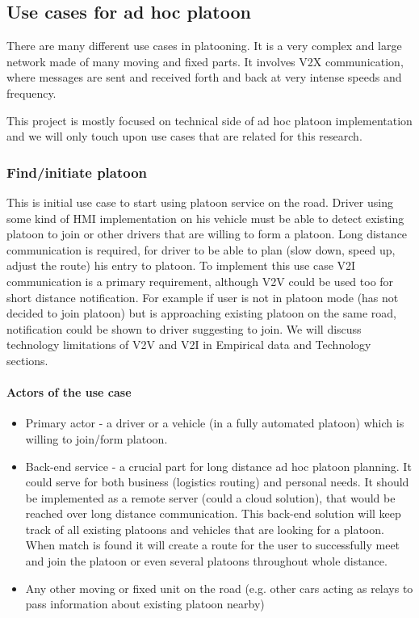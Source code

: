\subsection{Use cases for ad hoc platoon}
% 
There are many different use cases in platooning. It is a very complex and large network made of many moving and fixed parts. It involves V2X communication, where messages are sent and received forth and back at very intense speeds and frequency.\par
%  
This project is mostly focused on technical side of ad hoc platoon implementation and we will only touch upon use cases that are related for this research.
% 
\subsubsection{Find/initiate platoon}
% 
This is initial use case to start using platoon service on the road. Driver using some kind of HMI implementation on his vehicle must be able to detect existing platoon to join or other drivers that are willing to form a platoon. Long distance communication is required, for driver to be able to plan (slow down, speed up, adjust the route) his entry to platoon. To implement this use case V2I communication is a primary requirement, although V2V could be used too for short distance notification. For example if user is not in platoon mode (has not decided to join platoon) but is approaching existing platoon on the same road, notification could be shown to driver suggesting to join. We will discuss technology limitations of V2V and V2I in Empirical data and Technology sections.
% 
\paragraph{Actors of the use case}
\begin{itemize}[noitemsep]
    \item Primary actor - a driver or a vehicle (in a fully automated platoon) which is willing to join/form platoon.
    \item Back-end service - a crucial part for long distance ad hoc platoon planning. It could serve for both business (logistics routing) and personal needs. It should be implemented as a remote server (could a cloud solution), that would be reached over long distance communication. This back-end solution will keep track of all existing platoons and vehicles that are looking for a platoon. When match is found it will create a route for the user to successfully meet and join the platoon or even several platoons throughout whole distance.
    \item Any other moving or fixed unit on the road (e.g. other cars acting as relays to pass information about existing platoon nearby)
\end{itemize}
% 
